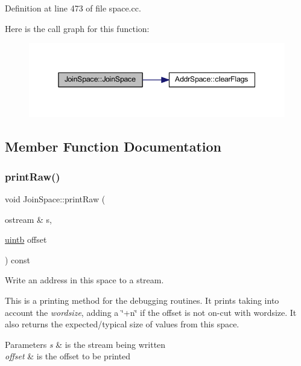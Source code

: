 Definition at line 473 of file space.\+cc.

Here is the call graph for this function\+:
\nopagebreak
\begin{figure}[H]
\begin{center}
\leavevmode
\includegraphics[width=345pt]{class_join_space_a567ec37c46a6932b744e2f2cf9e790c2_cgraph}
\end{center}
\end{figure}


\subsection{Member Function Documentation}
\mbox{\label{class_join_space_a23032ea3a76390d697779a99d15c75c8}} 
\subsubsection{\texorpdfstring{printRaw()}{printRaw()}}
{\footnotesize\ttfamily void Join\+Space\+::print\+Raw (\begin{DoxyParamCaption}\item[{ostream \&}]{s,  }\item[{\mbox{\hyperlink{types_8h_a2db313c5d32a12b01d26ac9b3bca178f}{uintb}}}]{offset }\end{DoxyParamCaption}) const\hspace{0.3cm}{\ttfamily [virtual]}}



Write an address in this space to a stream. 

This is a printing method for the debugging routines. It prints taking into account the {\itshape wordsize}, adding a \char`\"{}+n\char`\"{} if the offset is not on-\/cut with wordsize. It also returns the expected/typical size of values from this space. 
\begin{DoxyParams}{Parameters}
{\em s} & is the stream being written \\
\hline
{\em offset} & is the offset to be printed \\
\hline
\end{DoxyParams}


